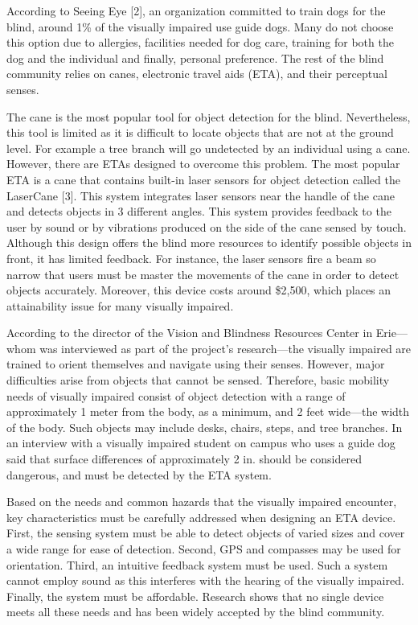 According to Seeing Eye {[}2{]}, an organization committed to train dogs
for the blind, around 1\% of the visually impaired use guide dogs. Many
do not choose this option due to allergies, facilities needed for dog
care, training for both the dog and the individual and finally, personal
preference. The rest of the blind community relies on canes, electronic
travel aids (ETA), and their perceptual senses.

The cane is the most popular tool for object detection for the blind.
Nevertheless, this tool is limited as it is difficult to locate objects
that are not at the ground level. For example a tree branch will go
undetected by an individual using a cane. However, there are ETAs
designed to overcome this problem. The most popular ETA is a cane that
contains built-in laser sensors for object detection called the
LaserCane {[}3{]}. This system integrates laser sensors near the handle
of the cane and detects objects in 3 different angles. This system
provides feedback to the user by sound or by vibrations produced on the
side of the cane sensed by touch. Although this design offers the blind
more resources to identify possible objects in front, it has limited
feedback. For instance, the laser sensors fire a beam so narrow that
users must be master the movements of the cane in order to detect
objects accurately. Moreover, this device costs around \$2,500, which
places an attainability issue for many visually impaired.

According to the director of the Vision and Blindness Resources Center
in Erie---whom was interviewed as part of the project's research---the
visually impaired are trained to orient themselves and navigate using
their senses. However, major difficulties arise from objects that cannot
be sensed. Therefore, basic mobility needs of visually impaired consist
of object detection with a range of approximately 1 meter from the body,
as a minimum, and 2 feet wide---the width of the body. Such objects may
include desks, chairs, steps, and tree branches. In an interview with a
visually impaired student on campus who uses a guide dog said that
surface differences of approximately 2 in. should be considered
dangerous, and must be detected by the ETA system.

Based on the needs and common hazards that the visually impaired
encounter, key characteristics must be carefully addressed when
designing an ETA device. First, the sensing system must be able to
detect objects of varied sizes and cover a wide range for ease of
detection. Second, GPS and compasses may be used for orientation. Third,
an intuitive feedback system must be used. Such a system cannot employ
sound as this interferes with the hearing of the visually impaired.
Finally, the system must be affordable. Research shows that no single
device meets all these needs and has been widely accepted by the blind
community.

